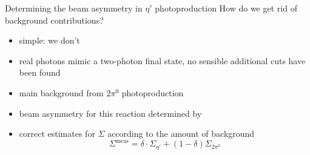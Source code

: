 \documentclass[11pt,aspectratio=169,dvipsnames]{beamer}
\begin{document}
\begin{frame}{Determining the beam asymmetry in $\eta'$ photoproduction}
	How do we get rid of background contributions?
	\begin{itemize}
		\pause
		\item simple: we don't
		\item real photons mimic a two-photon final state, no sensible additional cuts have been found
		\pause
		\item main background from $2\pi^0$ photoproduction
		\item beam asymmetry for this reaction determined by {\cites{mahlbergphd}}
		\item correct estimates for $\Sigma$ according to the amount of background
		$$\Sigma^\text{meas}=\delta\cdot\Sigma_{\eta'}+(1-\delta)\Sigma_{2\pi^0}$$
	\end{itemize}
\end{frame}
\end{document}
